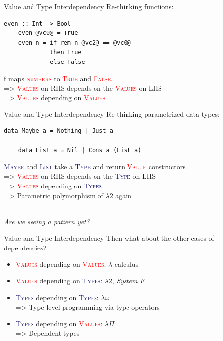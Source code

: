 \documentclass[xcolor={usenames,dvipsnames}]{beamer}
\newcommand{\htycon}[1]{\textcolor{MidnightBlue}{\textsc{#1}}}
\newcommand{\hvalcon}[1]{\textcolor{Red}{\textsc{#1}}}
\begin{document}
\begin{frame}[fragile]{Value and Type Interdependency}
  Re-thinking functions:
  \begin{lstlisting}[style=hask]
    even :: Int -> Bool
    even @vc0@ = True
    even n = if rem n @vc2@ == @vc0@
             then True
             else False
  \end{lstlisting}

  \qquad f maps \hvalcon{numbers} to \hvalcon{True} and \hvalcon{False}.
  \ \\
  \pause
  => \hvalcon{Values} on RHS depends on the \hvalcon{Values} on LHS
  \ \\
  \pause
  => \hvalcon{Values} depending on \hvalcon{Values}
\end{frame}

\begin{frame}[fragile]{Value and Type Interdependency}
  Re-thinking parametrized data types:
  \begin{lstlisting}[style=hask]
    data Maybe a = Nothing | Just a

    data List a = Nil | Cons a (List a)
  \end{lstlisting}

  \pause
  \qquad \htycon{Maybe} and \htycon{List} take a \htycon{Type} and return \hvalcon{Value} constructors
  \ \\
  \pause
  => \hvalcon{Values} on RHS depends on the \htycon{Type} on LHS
  \ \\
  \pause
  => \hvalcon{Values} depending on \htycon{Types}
  \ \\
  \pause
  => Parametric polymorphism of $\lambda2$ again

  \ \\
  \pause
  \textit{\tiny{Are we seeing a pattern yet?}}
\end{frame}

\begin{frame}[fragile]{Value and Type Interdependency}
  Then what about the other cases of dependencies?
  \pause
  \begin{itemize}
    \item \hvalcon{Values} depending on \hvalcon{Values}: $\lambda$-calculus
    \pause
    \item \hvalcon{Values} depending on \htycon{Types}: $\lambda2$, \textit{System F}
    \pause
    \item \htycon{Types} depending on \htycon{Types}: \pause$\lambda\underline\omega$\\
      => Type-level programming via type operators
    \pause
    \item \htycon{Types} depending on \hvalcon{Values}: \pause$\lambda\Pi$\\
      => Dependent types
  \end{itemize}
\end{frame}
\end{document}
